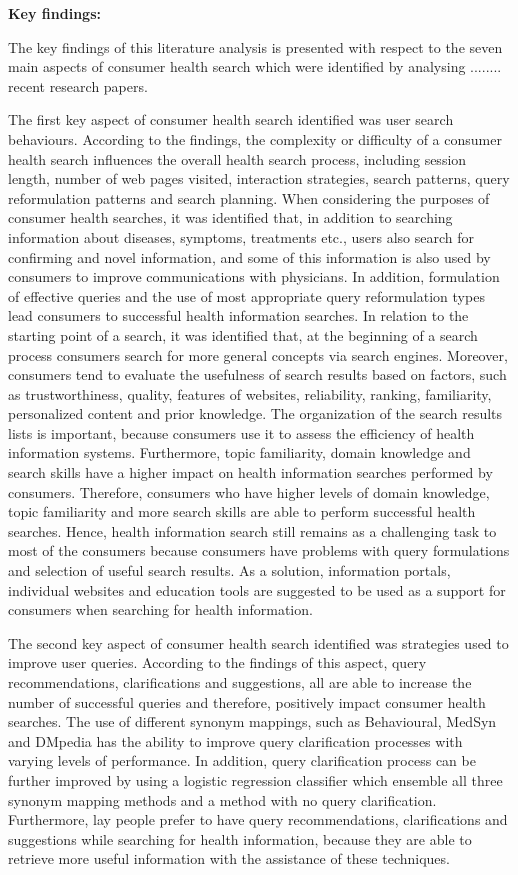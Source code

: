\documentclass[]{article}
\begin{document}
\textbf{Key findings:}

The key findings of this literature analysis is presented with respect to the seven main aspects of consumer health search which were identified by analysing ........ recent research papers. 

The first key aspect of consumer health search identified was user search behaviours. According to the findings, the complexity or difficulty of a consumer health search influences the overall health search process, including session length, number of web pages visited, interaction strategies, search patterns, query reformulation patterns and search planning. When considering the purposes of consumer health searches, it was identified that, in addition to searching information about diseases, symptoms, treatments etc., users also search for confirming and novel information, and some of this information is also used by consumers to improve communications with physicians. In addition, formulation of effective queries and the use of most appropriate query reformulation types lead consumers to successful health information searches. In relation to the starting point of a search, it was identified that, at the beginning of a search process consumers search for more general concepts via search engines. Moreover, consumers tend to evaluate the usefulness of search results based on factors, such as trustworthiness, quality, features of websites, reliability, ranking, familiarity, personalized content and prior knowledge. The organization of the search results lists is important, because consumers use it to assess the efficiency of health information systems. Furthermore, topic familiarity, domain knowledge and search skills have a higher impact on health information searches performed by consumers. Therefore, consumers who have higher levels of domain knowledge, topic familiarity and more search skills are able to perform successful health searches. Hence, health information search still remains as a challenging task to most of the consumers because consumers have problems with query formulations and selection of useful search results. As a solution, information portals, individual websites and education tools are suggested to be used as a support for consumers when searching for health information. 

The second key aspect of consumer health search identified was strategies used to improve user queries. According to the findings of this aspect, query recommendations, clarifications and suggestions, all are able to increase the number of successful queries and therefore, positively impact consumer health searches. The use of different synonym mappings, such as Behavioural, MedSyn and DMpedia has the ability to improve query clarification processes with varying levels of performance. In addition, query clarification process can be further improved by using a logistic regression classifier which ensemble all three synonym mapping methods and a method with no query clarification. Furthermore, lay people prefer to have query recommendations, clarifications and suggestions while searching for health information, because they are able to retrieve more useful information with the assistance of these techniques. 
\end{document}
